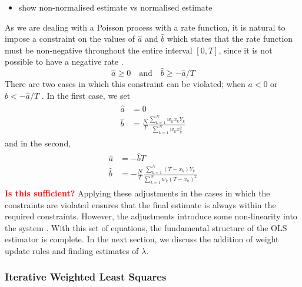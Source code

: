 \documentclass[a4paper,11pt]{article}
\begin{document}
\begin{itemize}
\item show non-normalised estimate vs normalised estimate
\end{itemize}

    As we are dealing with a Poisson process with a rate function, it is natural to
    impose a constraint on the values of $\hat{a}$ and $\hat{b}$ which states that
    the rate function must be non-negative throughout the entire interval $[0,T]$,
    since it is not possible to have a negative rate \cite{massey1996estimating}.
    \begin{equation}
    \hat{a}\geq 0\quad \text{and}\quad
    \hat{b}\geq -\hat{a}/T
    \end{equation}
    There are two cases in which this constraint can be violated; when $a<0$ or
    $b<-\hat{a}/T$ \cite{massey1996estimating}. In the first case, we set
    \begin{align}
    \begin{split}
    \hat{a}&=0\\
    \hat{b}&=\frac{N}{T}\frac{\displaystyle \sum_{k=1}^N w_kx_kY_k}{\displaystyle\sum_{k=1}^N w_kx_k^2}
    \end{split}
    \end{align}
    and in the second,
    \begin{align}
    \begin{split}
    \hat{a}&=-\hat{b}T\\
    \hat{b}&=-\frac{N}{T}\frac{\displaystyle \sum_{k=1}^N (T-x_k)Y_k}{\displaystyle \sum_{k=1}^N w_k(T-x_k)^2}
    \end{split}
    \end{align}
    \textcolor{red}{\textbf{Is this sufficient?}}
    Applying these adjustments in the cases in which the constraints are violated
    ensures that the final estimate is always within the required
    constraints. However, the adjustments introduce some non-linearity into the
    system \cite{massey1996estimating}. With this set of equations, the fundamental
    structure of the OLS estimator is complete. In the next section, we discuss the
    addition of weight update rules and finding estimates of $\lambda$.
\subsubsection{Iterative Weighted Least Squares}
\label{sec-6-1-2}
\end{document}
